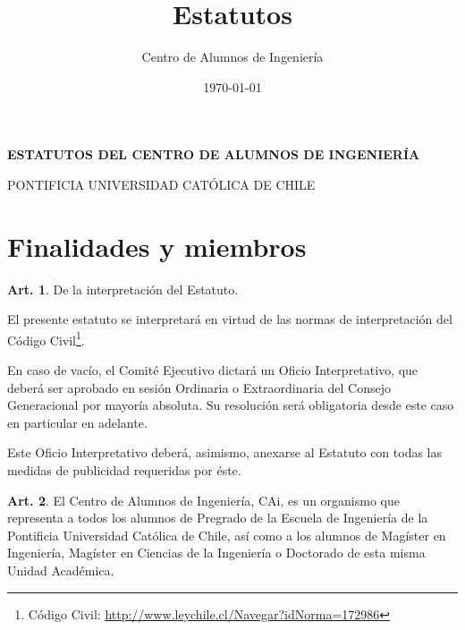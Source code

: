 \documentclass[letterpaper,11pt]{article}
\title{Estatutos}
\author{Centro de Alumnos de Ingeniería}
\date{\today}
\theoremstyle{definition}%
\newtheorem{art}{Art.} %
\begin{document}
\thispagestyle{plain}
\vspace*{-75pt}

\begin{center}
	\begin{Large}
		{\bf
			ESTATUTOS DEL CENTRO DE ALUMNOS DE INGENIERÍA

			PONTIFICIA UNIVERSIDAD CATÓLICA DE CHILE
		}
	\end{Large}

	\vspace*{30pt}

\end{center}

\section{Finalidades y miembros}\label{finalidades}

\begin{art}\label{interpretacionEstatuto}
	De la interpretación del Estatuto.

	El presente estatuto se interpretará en virtud de las normas de interpretación del Código Civil\footnote{Código Civil: \url{http://www.leychile.cl/Navegar?idNorma=172986}}.

	En caso de vacío, el Comité Ejecutivo dictará un Oficio Interpretativo, que deberá ser aprobado en sesión Ordinaria o Extraordinaria del Consejo Generacional por mayoría absoluta. Su resolución será obligatoria desde este caso en particular en adelante.

	Este Oficio Interpretativo deberá, asimismo, anexarse al Estatuto con todas las medidas de publicidad requeridas por éste.
\end{art}

\begin{art}\label{representacionCAi}
	El Centro de Alumnos de Ingeniería, CAi, es un organismo que representa a todos los alumnos de Pregrado de la Escuela de Ingeniería de la Pontificia Universidad Católica de Chile, así como a los alumnos de Magíster en Ingeniería, Magíster en Ciencias de la Ingeniería o Doctorado de esta misma Unidad Académica.
\end{art}
\end{document}
